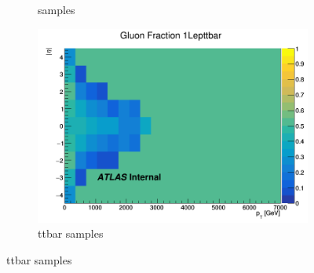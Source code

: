 \begin{figure}[p]
\begin{subfigure}[b]{0.3\textwidth}
        \caption{\Wjets samples}
        \label{fig:GluonFracWjets}
    \end{subfigure}
    \hfill
    \begin{subfigure}[b]{0.3\textwidth}
        \centering
        \includegraphics[width=\textwidth]{figures/QGfrac/GluonFrac2D_1Lepttbar.png}
        \caption{ttbar samples}
        \label{fig:GluonFracttbar}
    \end{subfigure}

    \bigskip


\end{figure}
